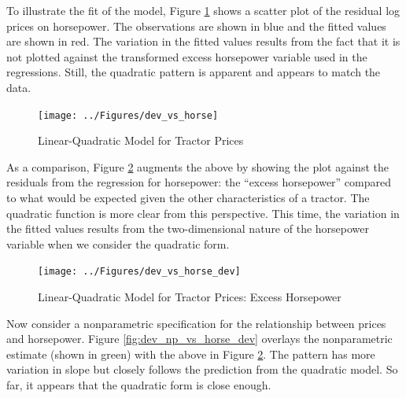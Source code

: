 \documentclass[11pt]{paper}
\begin{document}


\pagebreak 
To illustrate the fit of the model, 
Figure \ref{fig:dev_vs_horse} shows a scatter plot 
of the residual log prices on horsepower. 
The observations are shown in blue
and the fitted values are shown in red.
The variation in the fitted values results from the 
fact that it is not plotted against the transformed excess horsepower variable used in the regressions.
Still, the quadratic pattern is apparent
and appears to match the data. 

\begin{figure}[h!]
  \centering
  \texttt{[image: ../Figures/dev\_vs\_horse]}
  \caption{Linear-Quadratic Model for Tractor Prices} \label{fig:dev_vs_horse}
\end{figure}



\pagebreak
As a comparison, Figure \ref{fig:dev_vs_horse_dev} 
augments the above by showing the plot against the 
residuals from the regression for horsepower:
the ``excess horsepower'' compared to what would be 
expected given the other characteristics of a tractor. 
The quadratic function is more clear from this perspective. 
This time, the variation in the fitted values results from the 
two-dimensional nature of the horsepower variable
when we consider the quadratic form.


\begin{figure}[h!]
  \centering
  \texttt{[image: ../Figures/dev\_vs\_horse\_dev]}
  \caption{Linear-Quadratic Model for Tractor Prices: Excess Horsepower} \label{fig:dev_vs_horse_dev}
\end{figure}

\clearpage
Now consider a nonparametric specification for 
the relationship between prices and horsepower.
Figure \ref{fig:dev_np_vs_horse_dev} 
overlays the nonparametric estimate (shown in green) with the above in 
Figure \ref{fig:dev_vs_horse_dev}.
The pattern has more variation in slope but 
closely follows the prediction from the quadratic model. 
So far, it appears that the quadratic form
is close enough.
\end{document}
